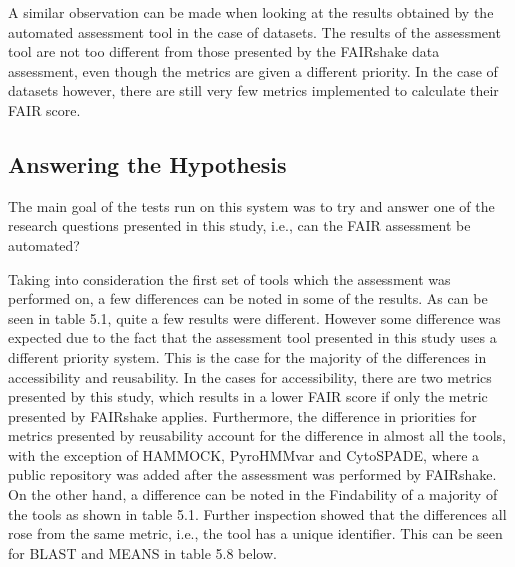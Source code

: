 \documentclass{cisfyp}
\begin{document}
A similar observation can be made when looking at the results obtained by the automated assessment tool in the case of datasets. The results of the assessment tool are not too different from those presented by the FAIRshake data assessment, even though the metrics are given a different priority. In the case of datasets however, there are still very few metrics implemented to calculate their FAIR score.

\subsection{Answering the Hypothesis}
The main goal of the tests run on this system was to try and answer one of the research questions presented in this study, i.e., can the FAIR assessment be automated? 

Taking into consideration the first set of tools which the assessment was performed on, a few differences can be noted in some of the results. As can be seen in table 5.1, quite a few results were different. However some difference was expected due to the fact that the assessment tool presented in this study uses a different priority system. This is the case for the majority of the differences in accessibility and reusability. In the cases for accessibility, there are two metrics presented by this study, which results in a lower FAIR score if only the metric presented by FAIRshake applies. Furthermore, the difference in priorities for metrics presented by reusability account for the difference in almost all the tools, with the exception of HAMMOCK, PyroHMMvar and CytoSPADE, where a public repository was added after the assessment was performed by FAIRshake. On the other hand, a difference can be noted in the Findability of a majority of the tools as shown in table 5.1. Further inspection showed that the differences all rose from the same metric, i.e., the tool has a unique identifier. This can be seen for BLAST and MEANS in table 5.8 below.
\end{document}
